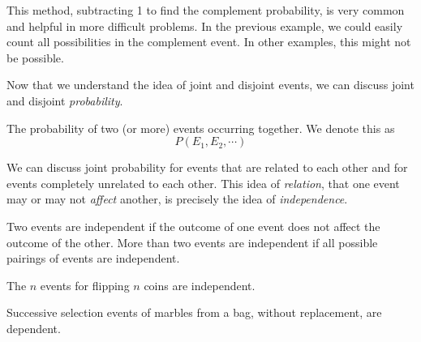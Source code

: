 \documentclass[main.tex]{subfiles}
\begin{document}
This method, subtracting 1 to find the complement probability, is very common and helpful in more difficult problems. In the previous example, we could easily count all possibilities in the complement event. In other examples, this might not be possible.


Now that we understand the idea of joint and disjoint events, we can discuss joint and disjoint \textit{probability}.

\begin{defn}
	The probability of two (or more) events occurring together. We denote this as \[P(E_1,E_2,\cdots)\]
\end{defn}

We can discuss joint probability for events that are related to each other and for events completely unrelated to each other. This idea of \textit{relation}, that one event may or may not \textit{affect} another, is precisely the idea of \textit{independence}.

\begin{defn}
	Two events are independent if the outcome of one event does not affect the outcome of the other. More than two events are independent if all possible pairings of events are independent.
\end{defn}

\begin{example}
	The \(n\) events for flipping \(n\) coins are independent.
\end{example}

\begin{example}
	Successive selection events of marbles from a bag, without replacement, are dependent.
\end{example}
\end{document}
